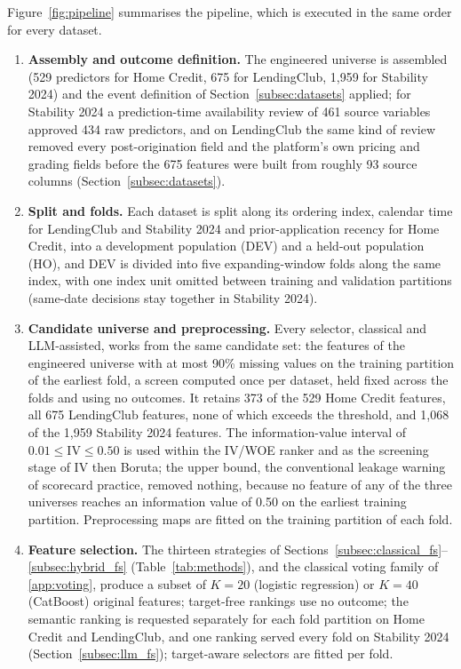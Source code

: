 \documentclass[final,5p,twocolumn]{elsarticle}
\newcommand{\Kfeat}{K}
\begin{document}
Figure~\ref{fig:pipeline} summarises the pipeline, which is executed in the same order for every dataset.
\begin{enumerate}
    \item \textbf{Assembly and outcome definition.} The engineered universe is assembled (529 predictors for Home Credit, 675 for LendingClub, 1,959 for Stability 2024) and the event definition of Section~\ref{subsec:datasets} applied; for Stability 2024 a prediction-time availability review of 461 source variables approved 434 raw predictors, and on LendingClub the same kind of review removed every post-origination field and the platform's own pricing and grading fields before the 675 features were built from roughly 93 source columns (Section~\ref{subsec:datasets}).
    \item \textbf{Split and folds.} Each dataset is split along its ordering index, calendar time for LendingClub and Stability 2024 and prior-application recency for Home Credit, into a development population (DEV) and a held-out population (HO), and DEV is divided into five expanding-window folds along the same index, with one index unit omitted between training and validation partitions (same-date decisions stay together in Stability 2024).
    \item \textbf{Candidate universe and preprocessing.} Every selector, classical and LLM-assisted, works from the same candidate set: the features of the engineered universe with at most 90\% missing values on the training partition of the earliest fold, a screen computed once per dataset, held fixed across the folds and using no outcomes. It retains 373 of the 529 Home Credit features, all 675 LendingClub features, none of which exceeds the threshold, and 1,068 of the 1,959 Stability 2024 features. The information-value interval of $0.01\le\mathrm{IV}\le0.50$ is used within the IV/WOE ranker and as the screening stage of IV then Boruta; the upper bound, the conventional leakage warning of scorecard practice, removed nothing, because no feature of any of the three universes reaches an information value of 0.50 on the earliest training partition. Preprocessing maps are fitted on the training partition of each fold.
    \item \textbf{Feature selection.} The thirteen strategies of Sections~\ref{subsec:classical_fs}--\ref{subsec:hybrid_fs} (Table~\ref{tab:methods}), and the classical voting family of \ref{app:voting}, produce a subset of $\Kfeat=20$ (logistic regression) or $\Kfeat=40$ (CatBoost) original features; target-free rankings use no outcome; the semantic ranking is requested separately for each fold partition on Home Credit and LendingClub, and one ranking served every fold on Stability 2024 (Section~\ref{subsec:llm_fs}); target-aware selectors are fitted per fold.

\end{enumerate}
\end{document}
